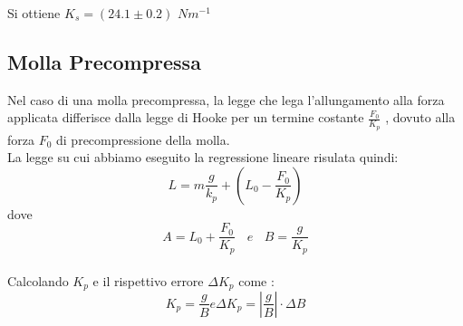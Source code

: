 \documentclass[12pt, a4paper]{article}
\begin{document}
Si ottiene $K_s = (24.1 \pm 0.2)$ $N m^{-1}$

\subsection{Molla Precompressa}
Nel caso di una molla precompressa, la legge che lega l'allungamento alla forza applicata differisce dalla legge di Hooke per un termine costante $\frac{F_0}{K_p}$ , dovuto alla forza $F_0$ di precompressione della molla.  
\\La legge su cui abbiamo eseguito la regressione lineare risulata quindi: 
\begin{equation}
    L = m \frac{g}{k_p} + (L_0 - \frac{F_0}{K_p}) 
\end{equation}
dove 
\begin{equation}
    A = L_0 + \frac{F_0}{K_p} \  \ \ \   e   \ \ \ \ B = \frac{g}{K_p}
\end{equation}
\\Calcolando $K_p$ e il rispettivo errore $\Delta K_p$ come : 
\begin{equation}
    K_p = \frac{g}{B} e \Delta K_p = \left | \frac{g}{B}  \right | \cdot \Delta B 
\end{equation}
\end{document}
